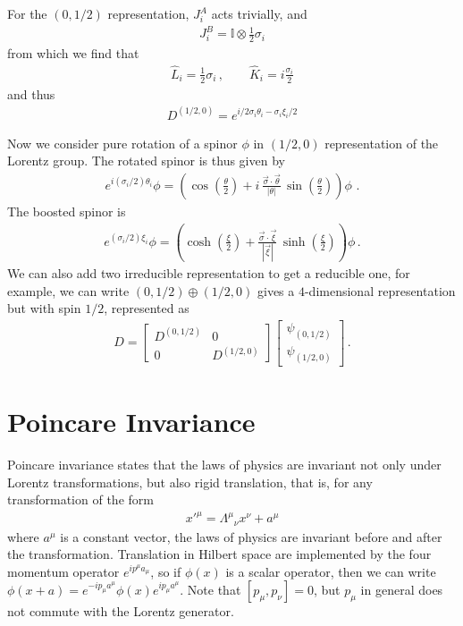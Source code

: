 \documentclass[11pt, onesided]{book}
\theoremstyle{break}
\theoremstyle{break}
\newcommand{\bmat}[1]{\begin{bmatrix} #1 \end{bmatrix}}
\begin{document}
For the $(0,1/2)$ representation, $J_i^A$ acts trivially, and 
\begin{align*}
J_i^B =\mathbb{I}\otimes  \frac{1}{2}\sigma_i
\end{align*}
from which we find that
\begin{align*}
\hat{L}_i = \frac{1}{2}\sigma_i \,,\qquad 
\hat{K}_i = i \frac{\sigma_i}{2}
\end{align*}
and thus
\begin{align*}
D^{(1/2,0)} = e^{i/2 \sigma_i \theta_i - \sigma_i\xi_i /2}
\end{align*}

Now we consider pure rotation of a spinor $\phi$ in $(1/2,0) $ representation of the Lorentz group. The rotated spinor is thus given by
\begin{align*}
e^{i (\sigma_i/2)\theta_i  } \phi = \left( \cos\left(\frac{\theta}{2} \right)  + i\, \frac{\vec{\sigma} \cdot \vec{\theta}}{|\theta|}\, \sin\left(\frac{\theta}{2} \right) \right) \phi\,\,.
\end{align*}
The boosted spinor is
\begin{align*}
e^{ (\sigma_i/2)\xi_i} \phi = \left(\cosh\left(\frac{\xi}{2}\right) + \frac{\vec{\sigma}\cdot \vec{\xi}}{|\vec{\xi}|}\,\sinh\left(\frac{\xi}{2}\right)\right) \phi\,.
\end{align*}
We can also add two irreducible representation to get a reducible one, for example, we can write $
\left(0,1/2\right) \oplus \left(1/2, 0\right)$ gives a $4$-dimensional representation but with spin $1/2$, represented as
\begin{align*}
D = \bmat{D^{(0,1/2)} & 0 \\ 0 & D^{(1/2,0)}} \bmat{\psi_{(0,1/2)} \\ \psi_{(1/2,0)}}\,.
\end{align*}

\section[Poincare Invariance]{\color{red} Poincare Invariance\color{black}}
Poincare invariance states that the laws of physics are invariant not only under Lorentz transformations, but also rigid translation, that is, for any transformation of the form
\begin{align*}
x'^\mu = \Lambda^\mu{}_\nu x^\nu + a^\mu
\end{align*}
where $a^\mu$ is a constant vector, the laws of physics are invariant before and after the transformation. Translation in Hilbert space are implemented by the four momentum operator $e^{i p^\mu a_\mu}$, 
so if $\phi(x)$ is a scalar operator, then we can write $\phi(x+a)=e^{-i p_\mu a^\mu} \phi(x) e^{ip_\mu a^\mu}$. Note that $[p_\mu, p_\nu ] =0$, but $p_\mu$ in general does not commute with the Lorentz generator. 
\end{document}
